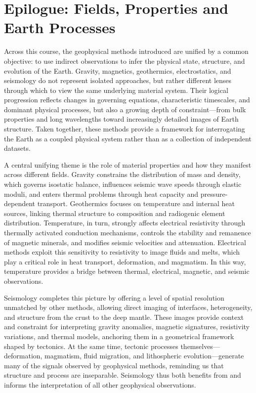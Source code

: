 \documentclass[11pt,a4paper]{article}
\begin{document}
\section{Epilogue: Fields, Properties and Earth Processes}
Across this course, the geophysical methods introduced are unified by a common objective: to use indirect observations to infer the physical state, structure, and evolution of the Earth. Gravity, magnetics, geothermics, electrostatics, and seismology do not represent isolated approaches, but rather different lenses through which to view the same underlying material system. Their logical progression reflects changes in governing equations, characteristic timescales, and dominant physical processes, but also a growing depth of constraint—from bulk properties and long wavelengths toward increasingly detailed images of Earth structure. Taken together, these methods provide a framework for interrogating the Earth as a coupled physical system rather than as a collection of independent datasets.

A central unifying theme is the role of material properties and how they manifest across different fields. Gravity constrains the distribution of mass and density, which governs isostatic balance, influences seismic wave speeds through elastic moduli, and enters thermal problems through heat capacity and pressure-dependent transport. Geothermics focuses on temperature and internal heat sources, linking thermal structure to composition and radiogenic element distribution. Temperature, in turn, strongly affects electrical resistivity through thermally activated conduction mechanisms, controls the stability and remanence of magnetic minerals, and modifies seismic velocities and attenuation. Electrical methods exploit this sensitivity to resistivity to image fluids and melts, which play a critical role in heat transport, deformation, and magmatism. In this way, temperature provides a bridge between thermal, electrical, magnetic, and seismic observations.

Seismology completes this picture by offering a level of spatial resolution unmatched by other methods, allowing direct imaging of interfaces, heterogeneity, and structure from the crust to the deep mantle. These images provide context and constraint for interpreting gravity anomalies, magnetic signatures, resistivity variations, and thermal models, anchoring them in a geometrical framework shaped by tectonics. At the same time, tectonic processes themselves—deformation, magmatism, fluid migration, and lithospheric evolution—generate many of the signals observed by geophysical methods, reminding us that structure and process are inseparable. Seismology thus both benefits from and informs the interpretation of all other geophysical observations.
\end{document}
